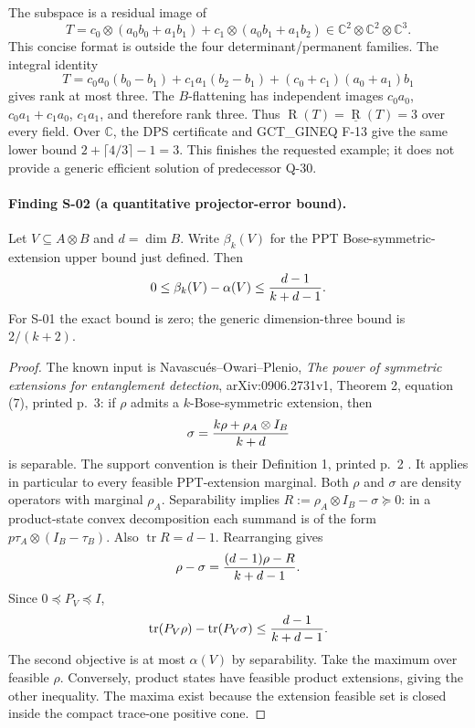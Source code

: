 The subspace is a residual image of
\[
 T=c_0\otimes(a_0b_0+a_1b_1)+c_1\otimes(a_0b_1+a_1b_2)
       \in\mathbb C^2\otimes\mathbb C^2\otimes\mathbb C^3.
\]
This concise format is outside the four determinant/permanent
families. The integral identity
\begin{equation}\label{eq:karatsuba}
 T=c_0a_0(b_0-b_1)+c_1a_1(b_2-b_1)
       +(c_0+c_1)(a_0+a_1)b_1
\end{equation}
gives rank at most three. The $B$-flattening has independent
images $c_0a_0$, $c_0a_1+c_1a_0$, $c_1a_1$, and therefore rank
three. Thus $\operatorname R(T)=\underline{\operatorname R}(T)=3$
over every field. Over $\mathbb C$, the DPS certificate and
GCT\_GINEQ F-13 give the same lower bound
$2+\lceil4/3\rceil-1=3$. This finishes the requested example;
it does not provide a generic efficient solution of predecessor Q-30.

\paragraph{Finding S-02 (a quantitative projector-error bound).}
Let $V\subseteq A\otimes B$ and $d=\dim B$. Write $\beta_k(V)$
for the PPT Bose-symmetric-extension upper bound just defined. Then
\begin{equation}\label{eq:dps-error}
 0\leq\beta_k(V)-\alpha(V)\leq {d-1\over k+d-1}.
\end{equation}
For S-01 the exact bound is zero; the generic dimension-three
bound is $2/(k+2)$.

\begin{proof}
The known input is Navascu\'es--Owari--Plenio,
\emph{The power of symmetric extensions for entanglement detection},
arXiv:0906.2731v1, Theorem 2, equation (7), printed p.~3:
if $\rho$ admits a $k$-Bose-symmetric extension, then
\[
 \sigma={k\rho+\rho_A\otimes I_B\over k+d}
\]
is separable. The support convention is their Definition 1,
printed p.~2 \cite{NOP}. It applies in particular to every feasible
PPT-extension marginal. Both $\rho$ and $\sigma$ are density
operators with marginal $\rho_A$. Separability implies
$R:=\rho_A\otimes I_B-\sigma\succeq0$: in a product-state
convex decomposition each summand is of the form
$p\tau_A\otimes(I_B-\tau_B)$. Also $\operatorname{tr}R=d-1$.
Rearranging gives
\[
 \rho-\sigma={(d-1)\rho-R\over k+d-1}.
\]
Since $0\preceq P_V\preceq I$,
\[
 \operatorname{tr}(P_V\rho)-\operatorname{tr}(P_V\sigma)
 \leq {d-1\over k+d-1}.
\]
The second objective is at most $\alpha(V)$ by separability.
Take the maximum over feasible $\rho$. Conversely, product
states have feasible product extensions, giving the other
inequality. The maxima exist because the extension feasible
set is closed inside the compact trace-one positive cone.
\end{proof}

